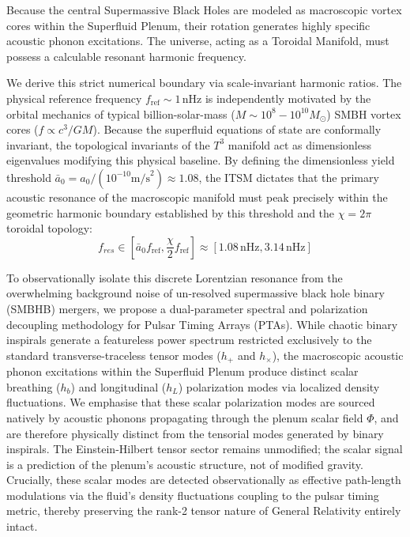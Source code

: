 \documentclass[aps,prd,10pt,twocolumn,superscriptaddress,nofootinbib,floatfix]{revtex4-2}
\begin{document}
Because the central Supermassive Black Holes are modeled as macroscopic vortex cores within the Superfluid Plenum, their rotation generates highly specific acoustic phonon excitations. The universe, acting as a Toroidal Manifold, must possess a calculable resonant harmonic frequency.

We derive this strict numerical boundary via scale-invariant harmonic ratios. The physical reference frequency $f_{\text{ref}} \sim 1\,\text{nHz}$ is independently motivated by the orbital mechanics of typical billion-solar-mass ($M \sim 10^8 - 10^{10} M_\odot$) SMBH vortex cores ($f \propto c^3/GM$). Because the superfluid equations of state are conformally invariant, the topological invariants of the $T^3$ manifold act as dimensionless eigenvalues modifying this physical baseline. By defining the dimensionless yield threshold $\bar{a}_0 = a_0 / (10^{-10} \text{m/s}^2) \approx 1.08$, the ITSM dictates that the primary acoustic resonance of the macroscopic manifold must peak precisely within the geometric harmonic boundary established by this threshold and the $\chi=2\pi$ toroidal topology:
\begin{equation}
f_{res} \in [\bar{a}_0 f_{\text{ref}}, \frac{\chi}{2} f_{\text{ref}}] \approx [1.08\,\text{nHz}, 3.14\,\text{nHz}]
\end{equation}

To observationally isolate this discrete Lorentzian resonance from the overwhelming background noise of un-resolved supermassive black hole binary (SMBHB) mergers, we propose a dual-parameter spectral and polarization decoupling methodology for Pulsar Timing Arrays (PTAs). While chaotic binary inspirals generate a featureless power spectrum restricted exclusively to the standard transverse-traceless tensor modes ($h_+$ and $h_{\times}$), the macroscopic acoustic phonon excitations within the Superfluid Plenum produce distinct scalar breathing ($h_b$) and longitudinal ($h_L$) polarization modes via localized density fluctuations. We emphasise that these scalar polarization modes are sourced natively by acoustic phonons propagating through the plenum scalar field $\Phi$, and are therefore physically distinct from the tensorial modes generated by binary inspirals. The Einstein-Hilbert tensor sector remains unmodified; the scalar signal is a prediction of the plenum's acoustic structure, not of modified gravity. Crucially, these scalar modes are detected observationally as effective path-length modulations via the fluid's density fluctuations coupling to the pulsar timing metric, thereby preserving the rank-2 tensor nature of General Relativity entirely intact.
\end{document}
